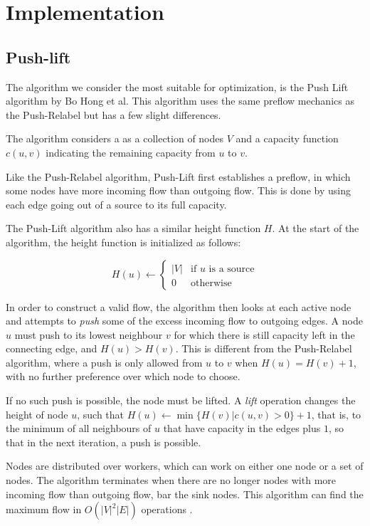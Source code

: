 \chapter{Implementation}

\section{Push-lift}

The algorithm we consider the most suitable for optimization, is the Push Lift algorithm by Bo Hong et al. This algorithm uses the same preflow mechanics as the Push-Relabel \cite{ANewApproachToTheMaxFlowProblem} but has a few slight differences.

The algorithm considers a as a collection of nodes $V$ and a capacity function $c(u, v)$ indicating the remaining capacity from $u$ to $v$.

Like the Push-Relabel algorithm, Push-Lift first establishes a preflow, in which some nodes have more incoming flow than outgoing flow. This is done by using each edge going out of a source to its full capacity.

The Push-Lift algorithm also has a similar height function $H$. At the start of the algorithm, the height function is initialized as follows:

$$
H(u) \gets \begin{cases}
	|V| & \text{if } u \text{ is a source} \\
	0 & \text{otherwise}
\end{cases}
$$

In order to construct a valid flow, the algorithm then looks at each active node  and attempts to \emph{push} some of the excess incoming flow to outgoing edges. A node $u$ must push to its lowest neighbour $v$ for which there is still capacity left in the connecting edge, and $H(u) > H(v)$. This is different from the Push-Relabel algorithm, where a push is only allowed from $u$ to $v$ when $H(u) = H(v) + 1$, with no further preference over which node to choose.

If no such push is possible, the node must be lifted. A \emph{lift} operation changes the height of node $u$, such that $H(u) \gets \min\{H(v) | c(u, v) > 0\} + 1$, that is, to the minimum of all neighbours of $u$ that have capacity in the edges plus $1$, so that in the next iteration, a push is possible.

Nodes are distributed over workers, which can work on either one node or a set of nodes. The algorithm terminates when there are no longer nodes with more incoming flow than outgoing flow, bar the sink nodes. This algorithm can find the maximum flow in $O(|V|^2|E|)$ operations \cite{LockFreeMultithreadedMaxFlow}.

